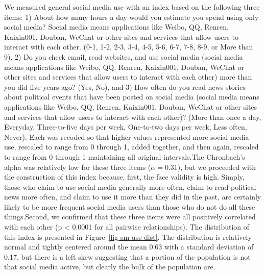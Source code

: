\documentclass[]{interact}
\theoremstyle{plain}%
\theoremstyle{definition}
\theoremstyle{remark}
\begin{document}
We measured general social media use with an index based on the
following three items: 1) About how many hours a day would you estimate
you spend using only social media? Social media means applications like
Weibo, QQ, Renren, Kaixin001, Douban, WeChat or other sites and services
that allow users to interact with each other. (0-1, 1-2, 2-3, 3-4, 4-5,
5-6, 6-7, 7-8, 8-9, or More than 9), 2) Do you check email, read
websites, and use social media (social media means applications like
Weibo, QQ, Renren, Kaixin001, Douban, WeChat or other sites and services
that allow users to interact with each other) more than you did five
years ago? (Yes, No), and 3) How often do you read news stories about
political events that have been posted on social media (social media
means applications like Weibo, QQ, Renren, Kaixin001, Douban, WeChat or
other sites and services that allow users to interact with each other)?
(More than once a day, Everyday, Three-to-five days per week, One-to-two
days per week, Less often, Never). Each was recoded so that higher
values represented more social media use, rescaled to range from 0
through 1, added together, and then again, rescaled to range from 0
through 1 maintaining all original intervals.The Chronbach's alpha was
relatively low for these three items (\(\alpha = 0.31\)), but we
proceeded with the construction of this index because, first, the face
validity is high. Simply, those who claim to use social media generally
more often, claim to read political news more often, and claim to use it
more than they did in the past, are certainly likely to be more frequent
social media users than those who do not do all these things.Second, we
confirmed that these three items were all positively correlated with
each other (p \textless{} 0.0001 for all pairwise relationships). The
distribution of this index is presented in Figure~\ref{fig-sm-use-dist}.
The distribution is relatively normal and tightly centered around the
mean 0.63 with a standard deviation of 0.17, but there is a left skew
suggesting that a portion of the population is not that social media
active, but clearly the bulk of the population are.
\end{document}

